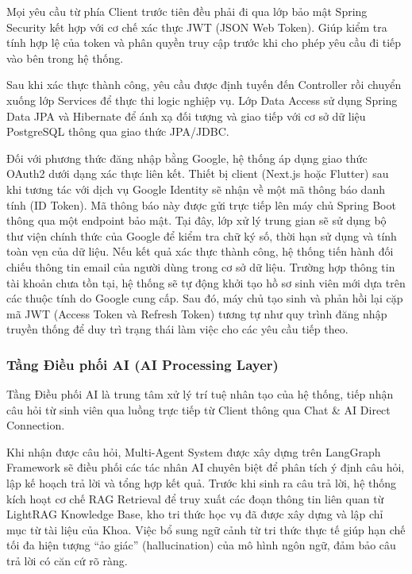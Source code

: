 Mọi yêu cầu từ phía Client trước tiên đều phải đi qua lớp bảo mật Spring Security kết hợp với cơ chế xác thực JWT (JSON Web Token). Giúp kiểm tra tính hợp lệ của token và phân quyền truy cập trước khi cho phép yêu cầu đi tiếp vào bên trong hệ thống.

Sau khi xác thực thành công, yêu cầu được định tuyến đến Controller rồi chuyển xuống lớp Services để thực thi logic nghiệp vụ. Lớp Data Access sử dụng Spring Data JPA và Hibernate để ánh xạ đối tượng và giao tiếp với cơ sở dữ liệu PostgreSQL thông qua giao thức JPA/JDBC.

Đối với phương thức đăng nhập bằng Google, hệ thống áp dụng giao thức OAuth2 dưới dạng xác thực liên kết. Thiết bị client (Next.js hoặc Flutter) sau khi tương tác với dịch vụ Google Identity sẽ nhận về một mã thông báo danh tính (ID Token). Mã thông báo này được gửi trực tiếp lên máy chủ Spring Boot thông qua một endpoint bảo mật. Tại đây, lớp xử lý trung gian sẽ sử dụng bộ thư viện chính thức của Google để kiểm tra chữ ký số, thời hạn sử dụng và tính toàn vẹn của dữ liệu. Nếu kết quả xác thực thành công, hệ thống tiến hành đối chiếu thông tin email của người dùng trong cơ sở dữ liệu. Trường hợp thông tin tài khoản chưa tồn tại, hệ thống sẽ tự động khởi tạo hồ sơ sinh viên mới dựa trên các thuộc tính do Google cung cấp. Sau đó, máy chủ tạo sinh và phản hồi lại cặp mã JWT (Access Token và Refresh Token) tương tự như quy trình đăng nhập truyền thống để duy trì trạng thái làm việc cho các yêu cầu tiếp theo.


\subsubsection{Tầng Điều phối AI (AI Processing Layer)}

Tầng Điều phối AI là trung tâm xử lý trí tuệ nhân tạo của hệ thống, tiếp nhận câu hỏi từ sinh viên qua luồng trực tiếp từ Client thông qua Chat \& AI Direct Connection.

Khi nhận được câu hỏi, Multi-Agent System được xây dựng trên LangGraph Framework sẽ điều phối các tác nhân AI chuyên biệt để phân tích ý định câu hỏi, lập kế hoạch trả lời và tổng hợp kết quả. Trước khi sinh ra câu trả lời, hệ thống kích hoạt cơ chế RAG Retrieval để truy xuất các đoạn thông tin liên quan từ LightRAG Knowledge Base, kho tri thức học vụ đã được xây dựng và lập chỉ mục từ tài liệu của Khoa. Việc bổ sung ngữ cảnh từ tri thức thực tế giúp hạn chế tối đa hiện tượng ``ảo giác'' (hallucination) của mô hình ngôn ngữ, đảm bảo câu trả lời có căn cứ rõ ràng.

